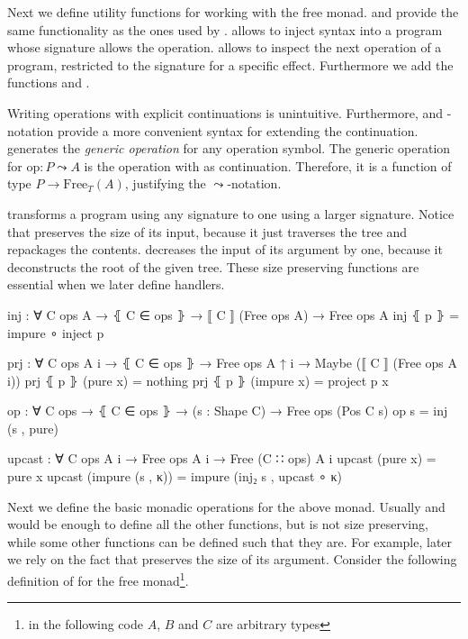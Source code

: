 Next we define utility functions for working with the free monad.
 and  provide the same functionality as the
ones used by \textcite{DBLP:conf/haskell/WuSH14}.
 allows to inject syntax into a program whose signature allows
the operation.
 allows to inspect the next operation of a
program, restricted to the signature for a specific effect.
Furthermore we add the functions  and .

Writing operations with explicit continuations is unintuitive.
Furthermore, \AgdaFunction{>>=} and -notation provide a more
convenient syntax for extending the continuation.
 generates the \textit{generic operation} for any operation
symbol.
The generic operation for $\mathrm{op} : P \leadsto A$ is the operation with
 as continuation.
Therefore, it is a function of type $P \rightarrow \mathrm{Free}_T(A)$,
justifying the $\leadsto$-notation.

 transforms a program using any signature to one using a
larger signature.
Notice that  preserves the size of its input, because it
just traverses the tree and repackages the contents.
 decreases the input of its argument by one, because it
deconstructs the root of the given tree.
These size preserving functions are essential when we later define handlers.

\begin{code}
inj : ∀ {C ops A} → ⦃ C ∈ ops ⦄ → ⟦ C ⟧ (Free ops A) → Free ops A
inj ⦃ p ⦄ = impure ∘ inject p

prj : ∀ {C ops A i} → ⦃ C ∈ ops ⦄ → Free ops A {↑ i} → Maybe (⟦ C ⟧ (Free ops A {i}))
prj ⦃ p ⦄ (pure x)    = nothing
prj ⦃ p ⦄ (impure x)  = project p x

op : ∀ {C ops} → ⦃ C ∈ ops ⦄ → (s : Shape C) → Free ops (Pos C s)
op s = inj (s , pure)

upcast : ∀ {C ops A i} → Free ops A {i} → Free (C ∷ ops) A {i}
upcast (pure x) = pure x
upcast (impure (s , κ)) = impure (inj₂ s , upcast ∘ κ)
\end{code}
Next we define the basic monadic operations for the above monad.
Usually \AgdaFunction{>>=} and  would be enough to define
all the other functions, but \AgdaFunction{>>=} is not size preserving, while
some other functions can be defined such that they are.
For example, later we rely on the fact that \AgdaFunction{<\$>} preserves
the size of its argument.
Consider the following definition of  for the free
monad\footnote{in the following code $A$, $B$ and $C$ are arbitrary types}.

